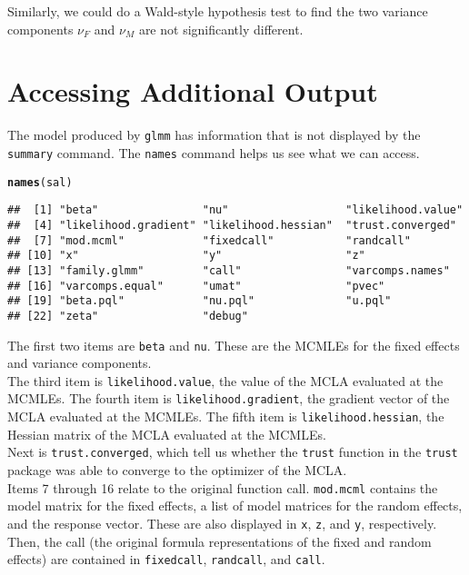\documentclass[11pt]{article}\usepackage[]{graphicx}\usepackage[]{color}
\makeatletter
\newcommand{\hlstd}[1]{\textcolor[rgb]{0.345,0.345,0.345}{#1}}%
\newcommand{\hlkwd}[1]{\textcolor[rgb]{0.737,0.353,0.396}{\textbf{#1}}}%
\newenvironment{kframe}{%
 \def\at@end@of@kframe{}%
 \ifinner\ifhmode%
  \def\at@end@of@kframe{\end{minipage}}%
  \begin{minipage}{\columnwidth}%
 \fi\fi%
 \def\FrameCommand##1{\hskip\@totalleftmargin \hskip-\fboxsep
 \colorbox{shadecolor}{##1}\hskip-\fboxsep
     \hskip-\linewidth \hskip-\@totalleftmargin \hskip\columnwidth}%
 \MakeFramed {\advance\hsize-\width
   \@totalleftmargin\z@ \linewidth\hsize
   \@setminipage}}%
 {\par\unskip\endMakeFramed%
 \at@end@of@kframe}
\newenvironment{knitrout}{}{} %
\makeatother
\begin{document}
Similarly, we could do a Wald-style hypothesis test to find the two variance components $\nu_F$ and $\nu_M$ are not significantly different.

\section{Accessing Additional Output}\label{sec:otherstuff}
The model produced by \texttt{glmm} has information that is not displayed by the \texttt{summary} command. The \texttt{names} command helps us see what we can access.
\begin{knitrout}
\color{fgcolor}\begin{kframe}
\begin{alltt}
\hlkwd{names}\hlstd{(sal)}
\end{alltt}
\begin{verbatim}
##  [1] "beta"                "nu"                  "likelihood.value"   
##  [4] "likelihood.gradient" "likelihood.hessian"  "trust.converged"    
##  [7] "mod.mcml"            "fixedcall"           "randcall"           
## [10] "x"                   "y"                   "z"                  
## [13] "family.glmm"         "call"                "varcomps.names"     
## [16] "varcomps.equal"      "umat"                "pvec"               
## [19] "beta.pql"            "nu.pql"              "u.pql"              
## [22] "zeta"                "debug"
\end{verbatim}
\end{kframe}
\end{knitrout}
The first two items are \texttt{beta} and \texttt{nu}. These are the MCMLEs for the fixed effects and variance components. \\

The third item is \texttt{likelihood.value}, the value of the MCLA evaluated at the MCMLEs. The fourth item is  \texttt{likelihood.gradient}, the gradient vector of the MCLA evaluated at the MCMLEs.  The fifth item is  \texttt{likelihood.hessian}, the Hessian matrix of the MCLA evaluated at the MCMLEs.\\

Next is \texttt{trust.converged}, which tell us whether the \texttt{trust} function in the \texttt{trust} package was able to converge to the optimizer of the MCLA.\\

Items 7 through 16 relate to the original function call. \texttt{mod.mcml} contains the model matrix for the fixed effects, a list of model matrices for the random effects, and the response vector. These are also displayed in \texttt{x}, \texttt{z}, and \texttt{y}, respectively. Then, the call (the original formula representations of the fixed and random effects) are contained in \texttt{fixedcall}, \texttt{randcall}, and \texttt{call}.\\
\end{document}
